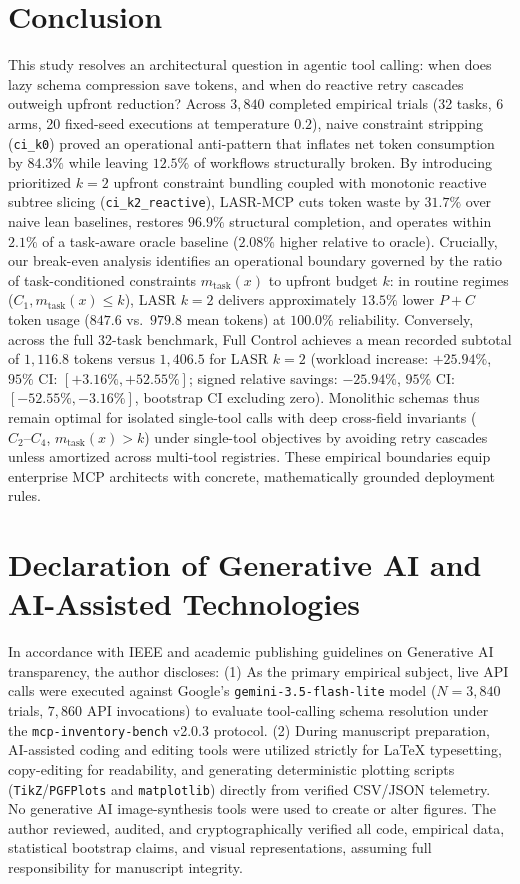 \section{Conclusion}
\label{sec:conclusion}
This study resolves an architectural question in agentic tool calling: when does lazy schema compression save tokens, and when do reactive retry cascades outweigh upfront reduction? Across $3,840$ completed empirical trials (32 tasks, 6 arms, 20 fixed-seed executions at temperature $0.2$), naive constraint stripping (\texttt{ci\_k0}) proved an operational anti-pattern that inflates net token consumption by $84.3\%$ while leaving $12.5\%$ of workflows structurally broken. By introducing prioritized $k=2$ upfront constraint bundling coupled with monotonic reactive subtree slicing (\texttt{ci\_k2\_reactive}), LASR-MCP cuts token waste by $31.7\%$ over naive lean baselines, restores $96.9\%$ structural completion, and operates within $2.1\%$ of a task-aware oracle baseline ($2.08\%$ higher relative to oracle). Crucially, our break-even analysis identifies an operational boundary governed by the ratio of task-conditioned constraints $m_{\text{task}}(x)$ to upfront budget $k$: in routine regimes ($C_1, m_{\text{task}}(x) \le k$), LASR $k=2$ delivers approximately $13.5\%$ lower $P+C$ token usage ($847.6$ vs.\ $979.8$ mean tokens) at $100.0\%$ reliability. Conversely, across the full 32-task benchmark, Full Control achieves a mean recorded subtotal of $1,116.8$ tokens versus $1,406.5$ for LASR $k=2$ (workload increase: $+25.94\%$, $95\%$ CI: $[+3.16\%, +52.55\%]$; signed relative savings: $-25.94\%$, $95\%$ CI: $[-52.55\%, -3.16\%]$, bootstrap CI excluding zero). Monolithic schemas thus remain optimal for isolated single-tool calls with deep cross-field invariants ($C_2\text{--}C_4$, $m_{\text{task}}(x) > k$) under single-tool objectives by avoiding retry cascades unless amortized across multi-tool registries. These empirical boundaries equip enterprise MCP architects with concrete, mathematically grounded deployment rules.

\section*{Declaration of Generative AI and AI-Assisted Technologies}
In accordance with IEEE and academic publishing guidelines on Generative AI transparency, the author discloses: (1) As the primary empirical subject, live API calls were executed against Google's \texttt{gemini-3.5-flash-lite} model ($N=3,840$ trials, $7,860$ API invocations) to evaluate tool-calling schema resolution under the \texttt{mcp-inventory-bench} v2.0.3 protocol. (2) During manuscript preparation, AI-assisted coding and editing tools were utilized strictly for LaTeX typesetting, copy-editing for readability, and generating deterministic plotting scripts (\texttt{TikZ}/\texttt{PGFPlots} and \texttt{matplotlib}) directly from verified CSV/JSON telemetry. No generative AI image-synthesis tools were used to create or alter figures. The author reviewed, audited, and cryptographically verified all code, empirical data, statistical bootstrap claims, and visual representations, assuming full responsibility for manuscript integrity.



